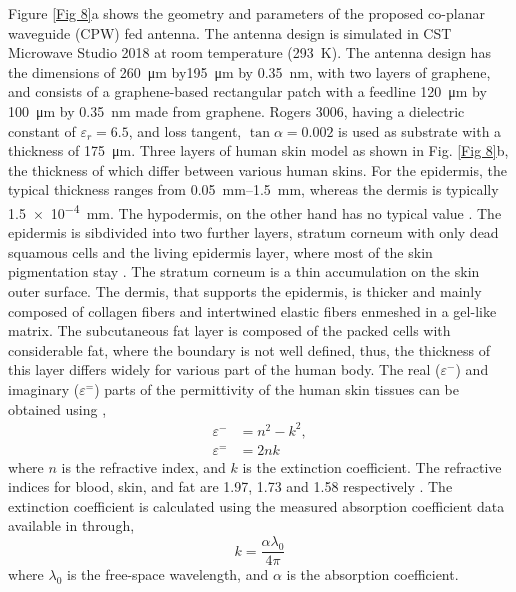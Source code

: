 \documentclass[12pt]{suhbook}
\begin{document}
Figure \ref{Fig 8}a shows the geometry and parameters of the proposed co-planar waveguide (CPW) fed antenna. The antenna design is simulated in CST Microwave Studio 2018 at room temperature (\SI{293}{\kelvin}). The antenna design has the dimensions of \SI{260}{\um} by\SI{195}{\um} by \SI{0.35}{\nm}, with two layers of graphene, and consists of a graphene-based rectangular patch with a feedline \SI{120}{\um} by \SI{100}{\um} by \SI{0.35}{\nm} made from graphene. Rogers \num{3006}, having a dielectric constant of $\varepsilon_r = 6.5$, and loss tangent, $\tan {\alpha} = 0.002$ is used as substrate with a thickness of \SI{175}{\um}. Three layers of human skin model as shown in Fig. \ref{Fig 8}b, the thickness of which differ between various human skins. For the epidermis, the typical thickness ranges from  \SIrange{.05}{1.5}{\mm}, whereas the dermis is typically \SI{1.5e-4}{\mm}. The hypodermis, on the other hand has no typical value \cite{dashti2018graphene}. The epidermis is sibdivided into two further layers, stratum corneum with only dead squamous cells and the living epidermis layer, where most of the skin pigmentation stay \cite{abadal2015time}. The stratum corneum is a thin accumulation on the skin outer surface. The dermis, that supports the epidermis, is thicker and mainly composed of collagen fibers and intertwined elastic fibers enmeshed in a gel-like matrix. The subcutaneous fat layer is composed of the packed cells with considerable fat, where the boundary is not well defined, thus, the thickness of this layer differs widely for various part of the human body. The real ($\varepsilon^-$) and imaginary ($\varepsilon^=$) parts of the permittivity of the human skin tissues can be obtained using \cite{berry2003optical,yang2015numerical},
% 
\begin{subequations}
\begin{align}
   \varepsilon^- &= n^2-k^2,
   \label{eq:real perimttivity} \\
    \varepsilon^= &= 2nk
\label{eq:imag perimttivity}
\end{align}
\label{eq:permititivty}
\end{subequations}
% 
where  $n$ is the refractive index, and $k$ is the extinction coefficient. The refractive indices for blood, skin, and fat are \num{1.97}, \num{1.73} and \num{1.58} respectively \cite{yang2015numerical}. The extinction coefficient is calculated using the measured absorption coefficient data available in \cite{fitzgerald2003catalogue,berry2003optical} through,
% 
\begin{equation}
k=\frac{\alpha\lambda_0}{4\pi}
\label{eq:abdorption}
\end{equation}
% 
where $\lambda_0$ is the free-space wavelength, and $\alpha$ is the absorption coefficient. 
\end{document}
